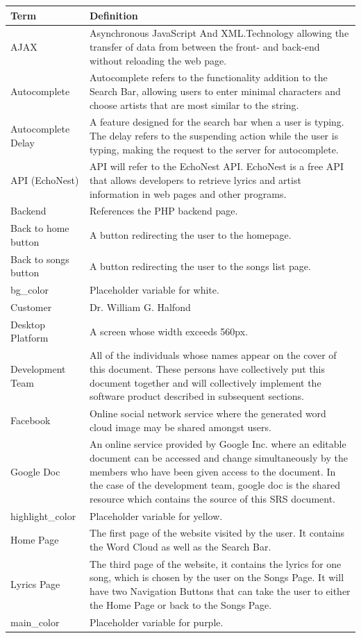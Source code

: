\documentclass[]{article}
\begin{document}
\begin{tabular}{p{4cm}|p{8cm}}
Term & Definition \\
\hline
AJAX & Asynchronous JavaScript And XML.Technology allowing the transfer of data from between the front- and back-end without reloading the web page. \\
Autocomplete & Autocomplete refers to the functionality addition to the Search Bar, allowing users to enter minimal characters and choose artists that are most similar to the string. \\
Autocomplete Delay & A feature designed for the search bar when a user is typing. The delay refers to the suspending action while the user is typing, making the request to the server for autocomplete. \\
API (EchoNest) & API will refer to the EchoNest API. EchoNest is a free API that allows developers to retrieve lyrics and artist information in web pages and other programs. \\
Backend & References the PHP backend page. \\
Back to home button & A button redirecting the user to the homepage. \\
Back to songs button & A button redirecting the user to the songs list page. \\
bg\_color & Placeholder variable for white. \\
Customer & Dr. William G. Halfond \\
Desktop Platform & A screen whose width exceeds 560px. \\
Development Team & All of the individuals whose names appear on the cover of this document. These persons have collectively put this document together and will collectively implement the software product described in subsequent sections. \\
Facebook & Online social network service where the generated word cloud image may be shared amongst users. \\
Google Doc & An online service provided by Google Inc. where an editable document can be accessed and change simultaneously by the members who have been given access to the document. In the case of the development team, google doc is the shared resource which contains the source of this SRS document. \\
highlight\_color & Placeholder variable for yellow. \\
Home Page & The first page of the website visited by the user. It contains the Word Cloud as well as the Search Bar. \\
Lyrics Page & The third page of the website, it contains the lyrics for one song, which is chosen by the user on the Songs Page. It will have two Navigation Buttons that can take the user to either the Home Page or back to the Songs Page. \\
main\_color & Placeholder variable for purple. \\
\end{tabular}
\end{document}
